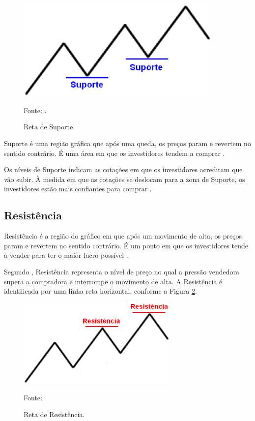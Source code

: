 \begin{figure}[H]
\centering
\includegraphics[width=0.9\textwidth]{figuras/retaSuporte}
\caption{Reta de Suporte.}{Fonte: .}
\label{retaSuporte}
\end{figure}

Suporte é uma região gráfica que após uma queda, os preços param e revertem no sentido contrário. É uma área em que os investidores tendem a comprar \cite[p~97]{debastini2008}.

Os níveis de Suporte indicam as cotações em que os investidores acreditam que vão subir. À medida em que as cotações se deslocam para a zona de Suporte, os investidores estão mais confiantes para comprar \cite{collins2012}.

\subsection{Resistência}

Resistência é a região do gráfico em que após um movimento de alta, os preços param e revertem no sentido contrário. É um ponto em que os investidores tende a vender para ter o maior lucro possível \cite[pág.~98]{debastini2008}.

Segundo , Resistência representa o nível de preço no qual a pressão vendedora supera a compradora e interrompe o movimento de alta. A Resistência é identificada por uma linha reta horizontal, conforme a Figura \ref{retaResistencia}.

\begin{figure}[H]
\centering
\includegraphics[width=0.7\textwidth]{figuras/retaResistencia}
\caption{Reta de Resistência.}{Fonte: } 
\label{retaResistencia}
\end{figure}

